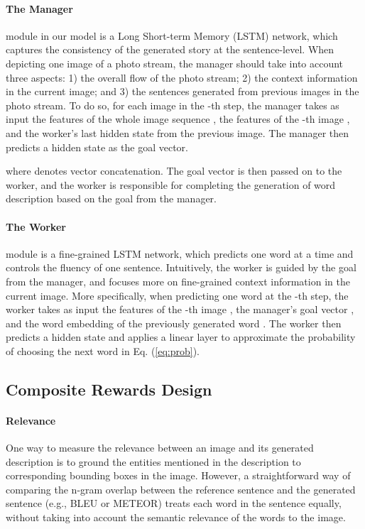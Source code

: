 \documentclass[letterpaper]{article} \usepackage{aaai20}  \usepackage{times}  \usepackage{helvet} \usepackage{courier}  \usepackage[hyphens]{url}  \usepackage{graphicx} \urlstyle{rm} \def\UrlFont{\rm}  \usepackage{graphicx}  \frenchspacing  \setlength{\pdfpagewidth}{8.5in}  \setlength{\pdfpageheight}{11in}  \usepackage{times}
\begin{document}
\paragraph{The Manager} module in our model is a Long Short-term Memory (LSTM) network, which captures the consistency of the generated story at the sentence-level. When depicting one image of a photo stream, the manager should take into account three aspects: 1) the overall flow of the photo stream; 2) the context information in the current image; and 3) the sentences generated from previous images in the photo stream. To do so, for each image in the -th step, the manager takes as input the features of the whole image sequence , the features of the -th image , and the worker's last hidden state  from the previous image. The manager then predicts a hidden state as the goal vector. 

where  denotes vector concatenation. The goal vector is then passed on to the worker, and the worker is responsible for completing the generation of word description based on the goal from the manager.  


\paragraph{The Worker} module is a fine-grained LSTM network, which predicts one word at a time and controls the fluency of one sentence. Intuitively, the worker is guided by the goal from the manager, and focuses more on fine-grained context information in the current image. More specifically, when predicting one word at the -th step, the worker takes as input the features of the -th image , the manager's goal vector , and the word embedding of the previously generated word . The worker then predicts a hidden state  and applies a linear layer  to approximate the probability of choosing the next word in Eq. (\ref{eq:prob}). 



\subsection{Composite Rewards Design}
\label{sec:reward}
\paragraph{Relevance}
One way to measure the relevance between an image and its generated description is to ground the entities mentioned in the description to corresponding bounding boxes in the image. However, a straightforward way of comparing the n-gram overlap between the reference sentence and the generated sentence (e.g., BLEU or METEOR) treats each word in the sentence equally, without taking into account the semantic relevance of the words to the image. 
\end{document}
